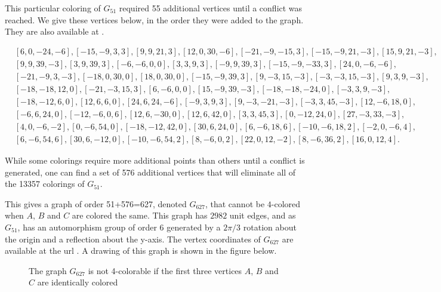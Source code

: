\documentclass [11pt,oneside]{amsart}
\theoremstyle{definition}
\theoremstyle{plain}
\begin{document}
This particular coloring of $G_{51}$ required 55 additional vertices until a conflict was reached. We give these vertices below, in the order they were added
to the graph. They are also available at \cite{website}.

{
\begin{align*}
&[6, 0, -24, -6], [-15, -9, 3, 3], [9, 9, 21, 3], [12, 0, 30, -6], [-21, -9, -15, 3], [-15, -9, 21, -3], [15, 9, 21, -3], \\
&[9, 9, 39, -3], [3, 9, 39, 3], [-6, -6, 0, 0], [3, 3, 9, 3], [-9, 9, 39, 3], [-15, -9, -33, 3], [24, 0, -6, -6],\\
&[-21, -9, 3, -3], [-18, 0, 30, 0], [18, 0, 30, 0], [-15, -9, 39, 3], [9, -3, 15, -3], [-3, -3, 15, -3], [9, 3, 9, -3],\\
&[-18, -18, 12, 0], [-21, -3, 15, 3], [6, -6, 0, 0], [15, -9, 39, -3], [-18, -18, -24, 0], [-3, 3, 9, -3], \\
&[-18, -12, 6, 0], [12, 6, 6, 0], [24, 6, 24, -6], [-9, 3, 9, 3], [9, -3, -21, -3], [-3, 3, 45, -3], [12, -6, 18, 0],\\
&[-6, 6, 24, 0], [-12, -6, 0, 6], [12, 6, -30, 0], [12, 6, 42, 0], [3, 3, 45, 3], [0, -12, 24, 0], [27, -3, 33, -3],\\
&[4, 0, -6, -2], [0, -6, 54, 0], [-18, -12, 42, 0], [30, 6, 24, 0], [6, -6, 18, 6], [-10, -6, 18, 2], [-2, 0, -6, 4],\\
&[6, -6, 54, 6],[30, 6, -12, 0], [-10, -6, 54, 2], [8, -6, 0, 2], [22, 0, 12, -2], [8, -6, 36, 2], [16, 0, 12, 4].
\end{align*}
}

While some colorings require more additional points than others until a conflict is generated,
one can find a set of 576 additional vertices that will eliminate all of the 13357 colorings of $G_{51}$.

This gives a graph of order 51+576=627, denoted $G_{627}$, that cannot be $4$-colored when $A$, $B$ and $C$
are colored the same. This graph has $2982$ unit edges, and as $G_{51}$, has an automorphism group of order 6
generated by a $2 \pi/3$ rotation about the origin and a reflection about the y-axis. The vertex coordinates of $G_{627}$ are available at the url \cite{website}.
A drawing of this graph is shown in the figure below.

\vspace{4mm}

\begin{figure}[ht]
\centering

\caption{The graph $G_{627}$ is not 4-colorable if the first three vertices $A$, $B$ and $C$ are identically colored}
\label{fig:g627}
\end{figure}
\end{document}
